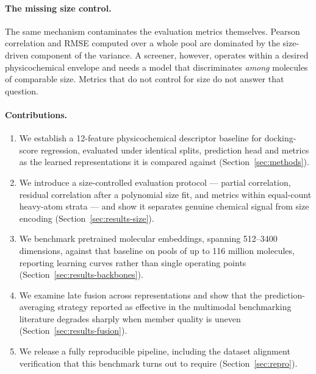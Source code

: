 \paragraph{The missing size control.}
The same mechanism contaminates the evaluation metrics themselves. Pearson
correlation and RMSE computed over a whole pool are dominated by the
size-driven component of the variance. A screener, however, operates within a
desired physicochemical envelope and needs a model that discriminates
\emph{among} molecules of comparable size. Metrics that do not control for size
do not answer that question.

\paragraph{Contributions.}
\begin{enumerate}
  \item We establish a \num{12}-feature physicochemical descriptor baseline for
        docking-score regression, evaluated under identical splits, prediction
        head and metrics as the learned representations it is compared
        against (Section~\ref{sec:methods}).
  \item We introduce a size-controlled evaluation protocol --- partial
        correlation, residual correlation after a polynomial size fit, and
        metrics within equal-count heavy-atom strata --- and show it separates
        genuine chemical signal from size encoding
        (Section~\ref{sec:results-size}).
  \item We benchmark  pretrained molecular embeddings, spanning
        \numrange{512}{3400} dimensions, against that baseline on pools of up to
        \num{116} million molecules, reporting learning curves rather than
        single operating points (Section~\ref{sec:results-backbones}).
  \item We examine late fusion across representations and show that the
        prediction-averaging strategy reported as effective in the multimodal
        benchmarking literature degrades sharply when member quality is uneven
        (Section~\ref{sec:results-fusion}).
  \item We release a fully reproducible pipeline, including the dataset
        alignment verification that this benchmark turns out to require
        (Section~\ref{sec:repro}).
\end{enumerate}

